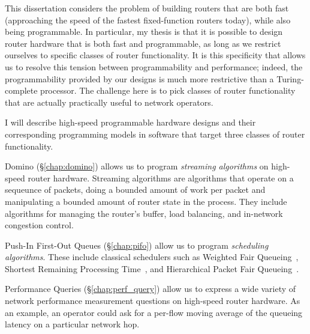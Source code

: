 This dissertation considers the problem of building routers that are both fast
(\ie approaching the speed of the fastest fixed-function routers today), while
also being programmable. In particular, my thesis is that it is possible to
design router hardware that is both fast and programmable, as long as we
restrict ourselves to specific classes of router functionality. It is this
specificity that allows us to resolve this tension between programmability and
performance; indeed, the programmability provided by our designs is much more
restrictive than a Turing-complete processor. The challenge here is to pick
classes of router functionality that are actually practically useful to network
operators.

I will describe high-speed programmable hardware designs and their
corresponding programming models in software that target three classes of
router functionality.
\begin{CompactEnumerate}
\item Domino (\S\ref{chap:domino}) allows us to program \textit{streaming
algorithms} on high-speed router hardware. Streaming algorithms are algorithms
that operate on a sequeunce of packets, doing a bounded amount of work per
packet and manipulating a bounded amount of router state in the process. They
include algorithms for managing the router's buffer, load balancing, and
in-network congestion control.
\item Push-In First-Out Queues (\S\ref{chap:pifo}) allow us to program \textit{
scheduling algorithms}. These include classical schedulers such as Weighted
Fair Queueing~\cite{wfq}, Shortest Remaining Processing Time~\cite{srpt}, and
Hierarchical Packet Fair Queueing~\cite{hpfq}.
\item Performance Queries (\S\ref{chap:perf_query}) allow us to express a wide
variety of network performance measurement questions on high-speed router hardware. As an example, an operator could ask for a per-flow moving average of the
queueing latency on a particular network hop.
\end{CompactEnumerate}
